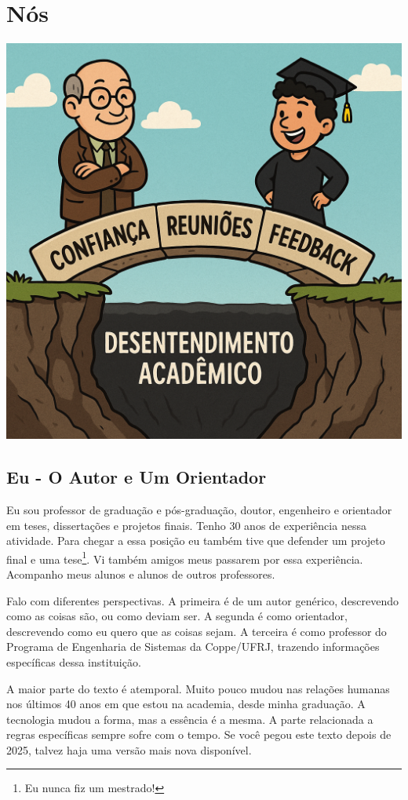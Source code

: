 \chapter{Nós}

\begin{center}
\includegraphics[width=0.5\linewidth]{Images/nos.png}    
\end{center}
\vspace{0.5cm}

\section{Eu - O Autor e Um Orientador}

Eu sou professor de graduação e pós-graduação, doutor, engenheiro e orientador em teses, dissertações e projetos finais. Tenho 30 anos de experiência nessa atividade. Para chegar a essa posição eu também tive que defender um projeto final e uma tese\footnote{Eu nunca fiz um mestrado!}. Vi também amigos meus passarem por essa experiência. Acompanho meus alunos e alunos de outros professores.

Falo com diferentes perspectivas. A primeira é de um autor genérico, descrevendo como as coisas são, ou como deviam ser. A segunda é como orientador, descrevendo como eu quero que as coisas sejam. A terceira é como professor do Programa de Engenharia de Sistemas da Coppe/UFRJ, trazendo informações específicas dessa instituição.

A maior parte do texto é atemporal. Muito pouco mudou nas relações humanas nos últimos 40 anos em que estou na academia, desde minha graduação. A tecnologia mudou a forma, mas a essência é a mesma. A parte relacionada a regras específicas sempre sofre com o tempo. Se você pegou este texto depois de 2025, talvez haja uma versão mais nova disponível. 



